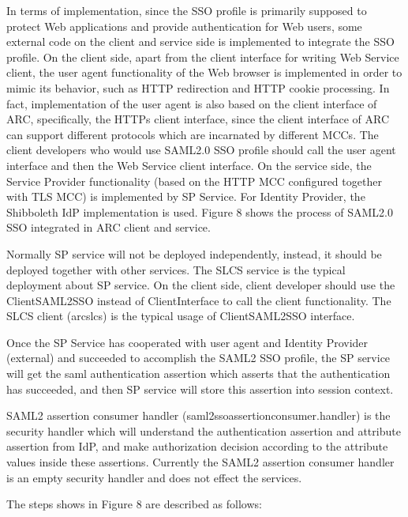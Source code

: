 \documentclass{article}                            %
\begin{document}
    In terms of implementation, since the SSO profile is primarily supposed to protect Web applications and provide authentication for Web users, some external code on the client and service side is implemented to integrate the SSO profile. On the client side, apart from the client interface for writing Web Service client, the user agent functionality of the Web browser is implemented in order to mimic its behavior, such as HTTP redirection and HTTP cookie processing. In fact, implementation of the user agent is also based on the client interface of ARC, specifically, the HTTPs client interface, since the client interface of ARC can support different protocols which are incarnated by different MCCs. The client developers who would use SAML2.0 SSO profile should call the user agent interface and then the Web Service client interface. On the service side, the Service Provider functionality (based on the HTTP MCC configured together with TLS MCC) is implemented by SP Service. For Identity Provider, the Shibboleth IdP implementation is used. Figure 8 shows the process of SAML2.0 SSO integrated in ARC client and service.

   Normally SP service will not be deployed independently, instead, it should be deployed together with other services. The SLCS service is the typical deployment about SP service. On the client side, client developer should use the ClientSAML2SSO instead of ClientInterface to call the client functionality. The SLCS client (arcslcs) is the typical usage of  ClientSAML2SSO interface.

    Once the SP Service has cooperated with user agent and Identity Provider (external) and succeeded to accomplish the SAML2 SSO profile,  the SP service will get the saml authentication assertion which asserts that the authentication has succeeded, and then SP service will store this assertion into session context.

    SAML2 assertion consumer handler (saml2ssoassertionconsumer.handler) is the security handler which will understand the authentication assertion and attribute assertion from IdP, and make authorization decision according to the attribute values inside these assertions. Currently the SAML2 assertion consumer handler is an empty security handler and does not effect the services.


The steps shows in Figure 8 are described as follows:
\end{document}
